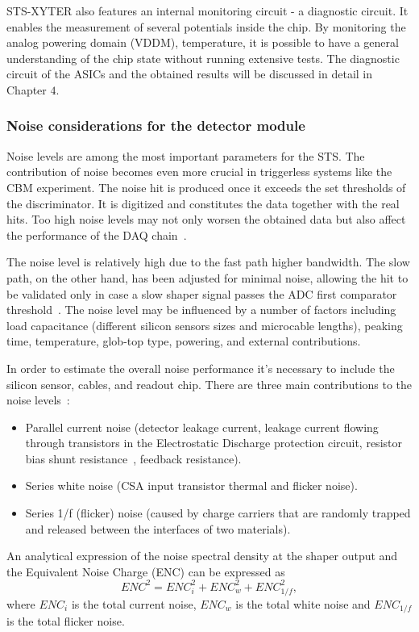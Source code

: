 STS-XYTER also features an internal monitoring circuit - a diagnostic circuit. It enables the measurement of several potentials inside the chip. By monitoring the analog powering domain (VDDM), temperature, it is possible to have a general understanding of the chip state without running extensive tests. The diagnostic circuit of the \glspl{ASIC} and the obtained results will be discussed in detail in Chapter $4$.
\subsubsection{Noise considerations for the detector module}
Noise levels are among the most important parameters for the \gls{STS}. The contribution of noise becomes even more crucial in triggerless systems like the \gls{CBM} experiment. The noise hit is produced once it exceeds the set thresholds of the discriminator. It is digitized and constitutes the data together with the real hits. Too high noise levels may not only worsen the obtained data but also affect the performance of the \gls{DAQ} chain~\cite{Heuser:54798}.

The noise level is relatively high due to the fast path higher bandwidth. The slow path, on the other hand, has been adjusted for minimal noise, allowing the hit to be validated only in case a slow shaper signal passes the ADC first comparator threshold~\cite{RodriguezRodriguez2020}. The noise level may be influenced by a number of factors including load capacitance 
(different silicon sensors sizes and microcable lengths), peaking time, temperature, glob-top type, powering, and external contributions.

In order to estimate the overall noise performance it's necessary to include the silicon sensor, cables, and readout chip. There are three main contributions to the noise levels~\cite{Toia:209729}:
\begin{itemize}
    \item Parallel current noise (detector leakage current, leakage current flowing through transistors in the Electrostatic Discharge protection circuit, resistor bias shunt resistance~\cite{Spieler}, feedback resistance).
    \item Series white noise (\gls{CSA} input transistor thermal and flicker noise).
    \item Series 1/f (flicker) noise (caused by charge carriers that are randomly trapped and released between the interfaces of two materials).
\end{itemize}
An analytical expression of the noise spectral density at the shaper output and the Equivalent Noise Charge (\gls{ENC}) can be expressed as
\begin{equation}
    ENC^{2} = ENC^{2}_{i} + ENC^{2}_{w} + ENC^{2}_{1/f},
\end{equation}
where $ENC_{i}$  is the total current noise, $ ENC_{w}$ is the total white noise and $ENC_{1/f}$ is the total flicker noise. 

